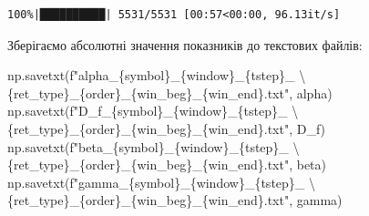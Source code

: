 \documentclass[
  letterpaper,
]{report}
\newenvironment{Shaded}{\begin{snugshade}}{\end{snugshade}}
\newcommand{\CharTok}[1]{\textcolor[rgb]{0.13,0.47,0.30}{#1}}
\newcommand{\NormalTok}[1]{\textcolor[rgb]{0.00,0.23,0.31}{#1}}
\newcommand{\SpecialCharTok}[1]{\textcolor[rgb]{0.37,0.37,0.37}{#1}}
\newcommand{\SpecialStringTok}[1]{\textcolor[rgb]{0.13,0.47,0.30}{#1}}
\begin{document}
\begin{verbatim}
100%|██████████| 5531/5531 [00:57<00:00, 96.13it/s] 
\end{verbatim}

Зберігаємо абсолютні значення показників до текстових файлів:

\begin{Shaded}
\begin{Highlighting}[]
\NormalTok{np.savetxt(}\SpecialStringTok{f"alpha\_}\SpecialCharTok{\{}\NormalTok{symbol}\SpecialCharTok{\}}\SpecialStringTok{\_}\SpecialCharTok{\{}\NormalTok{window}\SpecialCharTok{\}}\SpecialStringTok{\_}\SpecialCharTok{\{}\NormalTok{tstep}\SpecialCharTok{\}}\SpecialStringTok{\_ }\CharTok{\textbackslash{}}
\SpecialStringTok{            }\SpecialCharTok{\{}\NormalTok{ret\_type}\SpecialCharTok{\}}\SpecialStringTok{\_}\SpecialCharTok{\{}\NormalTok{order}\SpecialCharTok{\}}\SpecialStringTok{\_}\SpecialCharTok{\{}\NormalTok{win\_beg}\SpecialCharTok{\}}\SpecialStringTok{\_}\SpecialCharTok{\{}\NormalTok{win\_end}\SpecialCharTok{\}}\SpecialStringTok{.txt"}\NormalTok{, alpha)}
\NormalTok{np.savetxt(}\SpecialStringTok{f"D\_f\_}\SpecialCharTok{\{}\NormalTok{symbol}\SpecialCharTok{\}}\SpecialStringTok{\_}\SpecialCharTok{\{}\NormalTok{window}\SpecialCharTok{\}}\SpecialStringTok{\_}\SpecialCharTok{\{}\NormalTok{tstep}\SpecialCharTok{\}}\SpecialStringTok{\_ }\CharTok{\textbackslash{}}
\SpecialStringTok{            }\SpecialCharTok{\{}\NormalTok{ret\_type}\SpecialCharTok{\}}\SpecialStringTok{\_}\SpecialCharTok{\{}\NormalTok{order}\SpecialCharTok{\}}\SpecialStringTok{\_}\SpecialCharTok{\{}\NormalTok{win\_beg}\SpecialCharTok{\}}\SpecialStringTok{\_}\SpecialCharTok{\{}\NormalTok{win\_end}\SpecialCharTok{\}}\SpecialStringTok{.txt"}\NormalTok{, D\_f)}
\NormalTok{np.savetxt(}\SpecialStringTok{f"beta\_}\SpecialCharTok{\{}\NormalTok{symbol}\SpecialCharTok{\}}\SpecialStringTok{\_}\SpecialCharTok{\{}\NormalTok{window}\SpecialCharTok{\}}\SpecialStringTok{\_}\SpecialCharTok{\{}\NormalTok{tstep}\SpecialCharTok{\}}\SpecialStringTok{\_ }\CharTok{\textbackslash{}}
\SpecialStringTok{            }\SpecialCharTok{\{}\NormalTok{ret\_type}\SpecialCharTok{\}}\SpecialStringTok{\_}\SpecialCharTok{\{}\NormalTok{order}\SpecialCharTok{\}}\SpecialStringTok{\_}\SpecialCharTok{\{}\NormalTok{win\_beg}\SpecialCharTok{\}}\SpecialStringTok{\_}\SpecialCharTok{\{}\NormalTok{win\_end}\SpecialCharTok{\}}\SpecialStringTok{.txt"}\NormalTok{, beta)}
\NormalTok{np.savetxt(}\SpecialStringTok{f"gamma\_}\SpecialCharTok{\{}\NormalTok{symbol}\SpecialCharTok{\}}\SpecialStringTok{\_}\SpecialCharTok{\{}\NormalTok{window}\SpecialCharTok{\}}\SpecialStringTok{\_}\SpecialCharTok{\{}\NormalTok{tstep}\SpecialCharTok{\}}\SpecialStringTok{\_ }\CharTok{\textbackslash{}}
\SpecialStringTok{            }\SpecialCharTok{\{}\NormalTok{ret\_type}\SpecialCharTok{\}}\SpecialStringTok{\_}\SpecialCharTok{\{}\NormalTok{order}\SpecialCharTok{\}}\SpecialStringTok{\_}\SpecialCharTok{\{}\NormalTok{win\_beg}\SpecialCharTok{\}}\SpecialStringTok{\_}\SpecialCharTok{\{}\NormalTok{win\_end}\SpecialCharTok{\}}\SpecialStringTok{.txt"}\NormalTok{, gamma)}
\end{Highlighting}
\end{Shaded}
\end{document}
